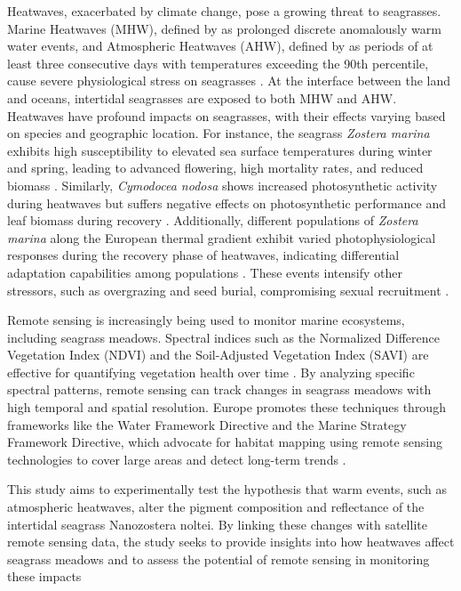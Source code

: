 \documentclass[
  number]{elsarticle}
\begin{document}
Heatwaves, exacerbated by climate change, pose a growing threat to
seagrasses. Marine Heatwaves (MHW), defined by
\citep{hobday2016hierarchical} as prolonged discrete anomalously warm
water events, and Atmospheric Heatwaves (AHW), defined by
\citep{perkins2013measurement} as periods of at least three consecutive
days with temperatures exceeding the 90th percentile, cause severe
physiological stress on seagrasses
\citep{sawall2021chronically, deguette2022physiological}. At the
interface between the land and oceans, intertidal seagrasses are exposed
to both MHW and AHW. Heatwaves have profound impacts on seagrasses, with
their effects varying based on species and geographic location. For
instance, the seagrass \emph{Zostera marina} exhibits high
susceptibility to elevated sea surface temperatures during winter and
spring, leading to advanced flowering, high mortality rates, and reduced
biomass \citep{sawall2021chronically}. Similarly, \emph{Cymodocea
nodosa} shows increased photosynthetic activity during heatwaves but
suffers negative effects on photosynthetic performance and leaf biomass
during recovery \citep{deguette2022physiological}. Additionally,
different populations of \emph{Zostera marina} along the European
thermal gradient exhibit varied photophysiological responses during the
recovery phase of heatwaves, indicating differential adaptation
capabilities among populations \citep{winters2011effects}. These events
intensify other stressors, such as overgrazing and seed burial,
compromising sexual recruitment \citep{guerrero2020heat}.

Remote sensing is increasingly being used to monitor marine ecosystems,
including seagrass meadows. Spectral indices such as the Normalized
Difference Vegetation Index (NDVI) and the Soil-Adjusted Vegetation
Index (SAVI) are effective for quantifying vegetation health over time
\citep{huete2012vegetation, kloos2021agricultural, carlan2020identifying, akbar2020mangrove}.
By analyzing specific spectral patterns, remote sensing can track
changes in seagrass meadows with high temporal and spatial resolution.
Europe promotes these techniques through frameworks like the Water
Framework Directive and the Marine Strategy Framework Directive, which
advocate for habitat mapping using remote sensing technologies to cover
large areas and detect long-term trends
\citep{papathanasopoulou2019satellite}.

This study aims to experimentally test the hypothesis that warm events,
such as atmospheric heatwaves, alter the pigment composition and
reflectance of the intertidal seagrass Nanozostera noltei. By linking
these changes with satellite remote sensing data, the study seeks to
provide insights into how heatwaves affect seagrass meadows and to
assess the potential of remote sensing in monitoring these impacts
\end{document}
